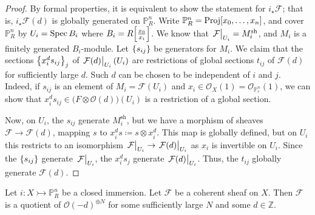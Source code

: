 \begin{proof}
    By formal properties, it is equivalent to show the statement for \( i_\star \mathcal F \); that is, \( i_\star \mathcal F(d) \) is globally generated on \( \mathbb P^n_R \).
    Write \( \mathbb P^n_R = \operatorname{Proj}[x_0, \dots, x_n] \), and cover \( \mathbb P^n_R \) by \( U_i = \operatorname{Spec} B_i \) where \( B_i = R\qty[\frac{x_0}{x_i}] \).
    We know that \( \eval{\mathcal F}_{U_i} = M_i^{\mathrm{sh}} \), and \( M_i \) is a finitely generated \( B_i \)-module.
    Let \( \qty{s_{ij}} \) be generators for \( M_i \).
    We claim that the sections \( \qty{x_i^d s_{ij}}_j \) of \( \eval{\mathcal F(d)}_{U_i}(U_i) \) are restrictions of global sections \( t_{ij} \) of \( \mathcal F(d) \) for sufficiently large \( d \).
    Such \( d \) can be chosen to be independent of \( i \) and \( j \).
    Indeed, if \( s_{ij} \) is an element of \( M_i = \mathcal F(U_i) \) and \( x_i \in \mathcal O_X(1) = \mathcal O_{\mathbb P^n_r}(1) \), we can show that \( x_i^d s_{ij} \in \mathcal (F \otimes \mathcal O(d))(U_i) \) is a restriction of a global section.

    Now, on \( U_i \), the \( s_{ij} \) generate \( M_i^{\mathrm{sh}} \), but we have a morphism of sheaves \( \mathcal F \to \mathcal F(d) \), mapping \( s \) to \( x_i^d s \coloneq s \otimes x_i^d \).
    This map is globally defined, but on \( U_i \) this restricts to an isomorphism \( \eval{\mathcal F}_{U_i} \to \eval{\mathcal F(d)}_{U_i} \) as \( x_i \) is invertible on \( U_i \).
    Since the \( \qty{s_{ij}} \) generate \( \eval{\mathcal F}_{U_i} \), the \( x_i^d s_j \) generate \( \eval{\mathcal F(d)}_{U_i} \).
    Thus, the \( t_{ij} \) globally generate \( \mathcal F(d) \).
\end{proof}
\begin{corollary}
    Let \( i : X \rightarrowtail \mathbb P^n_R \) be a closed immersion.
    Let \( \mathcal F \) be a coherent sheaf on \( X \).
    Then \( \mathcal F \) is a quotient of \( \mathcal O(-d)^{\oplus N} \) for some sufficiently large \( N \) and some \( d \in \mathbb Z \).
\end{corollary}
